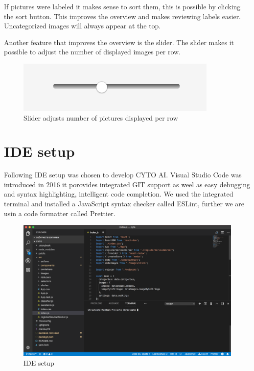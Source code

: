 If pictures were labeled it makes sense to sort them, this
is possible by clicking the sort button. This improves the
overview and makes reviewing labels easier. Uncategorized
images will always appear at the top.
 
Another feature that improves the overview is the slider. The slider makes it possible to adjust the number of displayed images per row. 

\begin{figure}[H]
	\centering
	\includegraphics[scale=0.8]{bilder/cyto/Slider.png}
	\caption{Slider adjusts number of pictures displayed per row}
	\label{fig:Slider}
\end{figure}

\section{IDE setup}
Following IDE setup was chosen to develop CYTO AI.
Visual Studio Code was introduced in 2016 it porovides integrated GIT support as weel as easy debugging and syntax highlighting, intelligent code completion.
We used the integrated terminal and installed a JavaScript syntax checker called ESLint, further we are usin a code formatter called Prettier. 

\begin{figure}[H]
	\centering
	\includegraphics[width=\linewidth]{bilder/cyto/IDE.png}
	\caption{IDE setup}
	\label{fig:IDE}
\end{figure}

